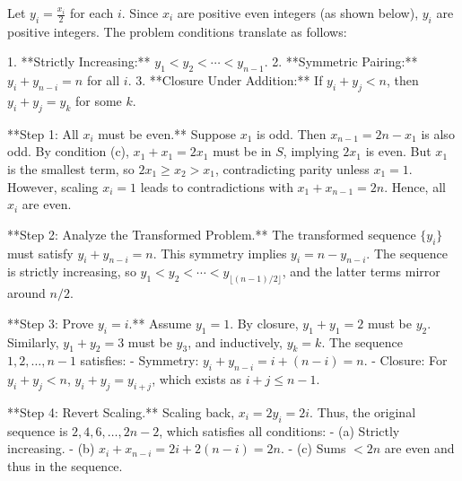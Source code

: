 {Let \( y_i = \frac{x_i}{2} \) for each \( i \). Since \( x_i \) are positive even integers (as shown below), \( y_i \) are positive integers. The problem conditions translate as follows:

1. **Strictly Increasing:** \( y_1 < y_2 < \cdots < y_{n-1} \).
2. **Symmetric Pairing:** \( y_i + y_{n-i} = n \) for all \( i \).
3. **Closure Under Addition:** If \( y_i + y_j < n \), then \( y_i + y_j = y_k \) for some \( k \).

**Step 1: All \( x_i \) must be even.**  
Suppose \( x_1 \) is odd. Then \( x_{n-1} = 2n - x_1 \) is also odd. By condition (c), \( x_1 + x_1 = 2x_1 \) must be in \( S \), implying \( 2x_1 \) is even. But \( x_1 \) is the smallest term, so \( 2x_1 \geq x_2 > x_1 \), contradicting parity unless \( x_1 = 1 \). However, scaling \( x_i = 1 \) leads to contradictions with \( x_1 + x_{n-1} = 2n \). Hence, all \( x_i \) are even.

**Step 2: Analyze the Transformed Problem.**  
The transformed sequence \( \{y_i\} \) must satisfy \( y_i + y_{n-i} = n \). This symmetry implies \( y_i = n - y_{n-i} \). The sequence is strictly increasing, so \( y_1 < y_2 < \cdots < y_{\lfloor (n-1)/2 \rfloor} \), and the latter terms mirror around \( n/2 \).

**Step 3: Prove \( y_i = i \).**  
Assume \( y_1 = 1 \). By closure, \( y_1 + y_1 = 2 \) must be \( y_2 \). Similarly, \( y_1 + y_2 = 3 \) must be \( y_3 \), and inductively, \( y_k = k \). The sequence \( 1, 2, \ldots, n-1 \) satisfies:
- Symmetry: \( y_i + y_{n-i} = i + (n - i) = n \).
- Closure: For \( y_i + y_j < n \), \( y_i + y_j = y_{i+j} \), which exists as \( i+j \leq n-1 \).

**Step 4: Revert Scaling.**  
Scaling back, \( x_i = 2y_i = 2i \). Thus, the original sequence is \( 2, 4, 6, \ldots, 2n-2 \), which satisfies all conditions:
- (a) Strictly increasing.
- (b) \( x_i + x_{n-i} = 2i + 2(n-i) = 2n \).
- (c) Sums \( <2n \) are even and thus in the sequence.

}
